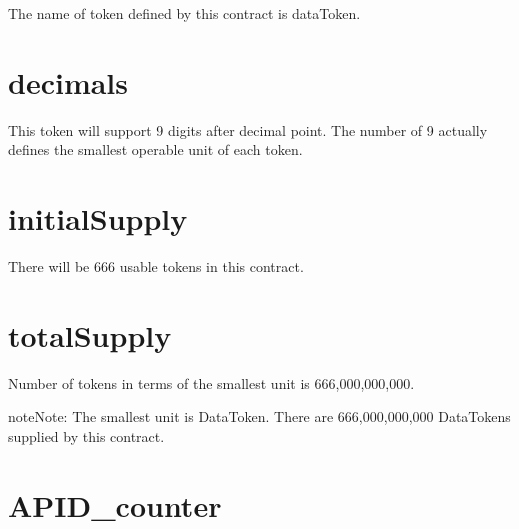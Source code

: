 \documentclass[letterpaper,10pt,english]{sphinxmanual}
\begin{document}
The name of token defined by this contract is dataToken.


\section{decimals}
\label{\detokenize{index:decimals}}
%
\begin{sphinxVerbatim}[commandchars=\\\{\}]
    
\end{sphinxVerbatim}

This token will support 9 digits after decimal point.
The number of 9 actually defines the smallest operable unit of each token.


\section{initialSupply}
\label{\detokenize{index:initialsupply}}
%
\begin{sphinxVerbatim}[commandchars=\\\{\}]
   
\end{sphinxVerbatim}

There will be 666 usable tokens in this contract.


\section{totalSupply}
\label{\detokenize{index:totalsupply}}
%
\begin{sphinxVerbatim}[commandchars=\\\{\}]
       
\end{sphinxVerbatim}

Number of tokens in terms of the smallest unit
is 666,000,000,000.

\begin{sphinxadmonition}{note}{Note:}
The smallest unit is DataToken. There are 666,000,000,000 DataTokens supplied by this contract.
\end{sphinxadmonition}


\section{APID\_counter}
\label{\detokenize{index:apid-counter}}
%
\begin{sphinxVerbatim}[commandchars=\\\{\}]
   
\end{sphinxVerbatim}
\end{document}
